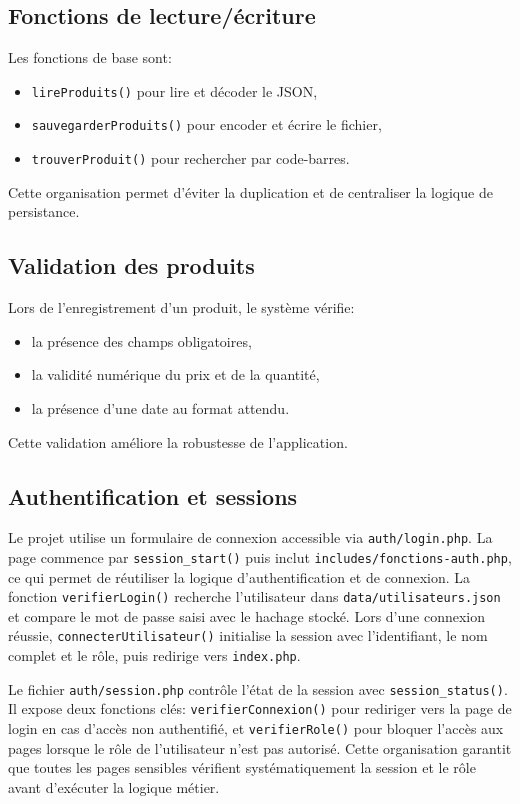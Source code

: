 \documentclass[12pt,a4paper]{article}
\begin{document}
\subsection{Fonctions de lecture/écriture}
Les fonctions de base sont:
\begin{itemize}
  \item \texttt{lireProduits()} pour lire et décoder le JSON,
  \item \texttt{sauvegarderProduits()} pour encoder et écrire le fichier,
  \item \texttt{trouverProduit()} pour rechercher par code-barres.
\end{itemize}

Cette organisation permet d'éviter la duplication et de centraliser la logique de persistance.

\subsection{Validation des produits}
Lors de l'enregistrement d'un produit, le système vérifie:
\begin{itemize}
  \item la présence des champs obligatoires,
  \item la validité numérique du prix et de la quantité,
  \item la présence d'une date au format attendu.
\end{itemize}

Cette validation améliore la robustesse de l'application.

\subsection{Authentification et sessions}
Le projet utilise un formulaire de connexion accessible via \texttt{auth/login.php}. La page commence par \texttt{session\_start()} puis inclut \texttt{includes/fonctions-auth.php}, ce qui permet de réutiliser la logique d'authentification et de connexion.
La fonction \texttt{verifierLogin()} recherche l'utilisateur dans \texttt{data/utilisateurs.json} et compare le mot de passe saisi avec le hachage stocké. Lors d'une connexion réussie, \texttt{connecterUtilisateur()} initialise la session avec l'identifiant, le nom complet et le rôle, puis redirige vers \texttt{index.php}.

Le fichier \texttt{auth/session.php} contrôle l'état de la session avec \texttt{session\_status()}. Il expose deux fonctions clés: \texttt{verifierConnexion()} pour rediriger vers la page de login en cas d'accès non authentifié, et \texttt{verifierRole()} pour bloquer l'accès aux pages lorsque le rôle de l'utilisateur n'est pas autorisé. Cette organisation garantit que toutes les pages sensibles vérifient systématiquement la session et le rôle avant d'exécuter la logique métier.
\end{document}
